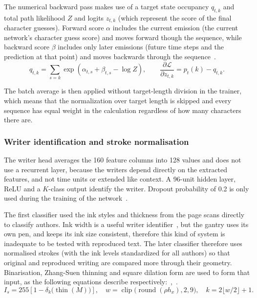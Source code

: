 The numerical backward pass makes use of a target state occupancy $q_{t,k}$ and total path likelihood $Z$ and logits $z_{t,k}$ (which represent the score of the final character guesses). Forward score $\alpha$ includes the current emission (the current network's character guess score) and moves forward though the sequence, while backward score $\beta$ includes only later emissions (future time steps and the prediction at that point) and moves backwards through the sequence~\cite[pp.~4--6]{graves2006}.
\begin{equation}
q_{t,k}=\sum_{s=k}\exp(\alpha_{t,s}+\beta_{t,s}-\log Z),
\qquad \frac{\partial\mathcal L}{\partial z_{t,k}}=p_t(k)-q_{t,k}.
\label{eq:des-ctcgrad}
\end{equation}

The batch average is then applied without target-length division in the trainer, which means that the normalization over target length is skipped and every sequence has equal weight in the calculation regardless of how many characters there are. 

\subsubsection{Writer identification and stroke normalisation}
\label{sec:des-shapenamer}
The writer head averages the 160 feature columns into 128 values and does not use a recurrent layer, because the writers depend directly on the extracted features, and not time units or extended like context. A 96-unit hidden layer, ReLU and a $K$-class output identify the writer. Dropout probability of 0.2 is only used during the training of the network~\cite[pp.~1931, 1934]{srivastava2014}.

The first classifier used the ink styles and thickness from the page scans directly to classify authors. Ink width is a useful writer identifier~\cite[p.~162]{brink2012}, but the gantry uses its own pen, and keeps its ink size consistent, therefore this kind of system is inadequate to be tested with reproduced text. The later classifier therefore uses normalised strokes (with the ink levels standardized for all authors) so that original and reproduced writing are compared more through their geometry. Binarisation, Zhang-Suen thinning and square dilation form are used to form that input, as the following equations describe respectively:~\cite[p.~237]{zhang1984},~\cite[p.~533]{haralick1987}.
\begin{equation}
I_s=255\left[1-\delta_k\bigl(\operatorname{thin}(M)\bigr)\right],\quad
w=\operatorname{clip}\bigl(\operatorname{round}(\rho h_x),2,9\bigr),\quad
k=2\lfloor w/2\rfloor+1.
\label{eq:des-strokenorm}
\end{equation}

